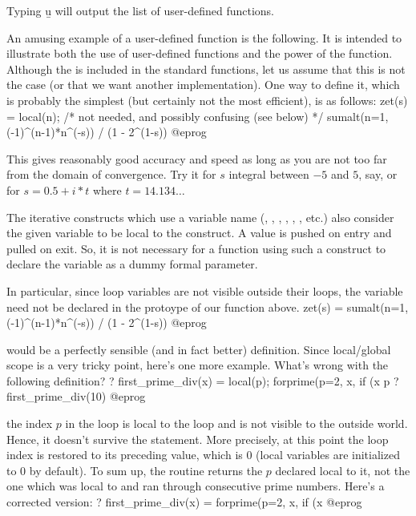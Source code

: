 Typing \b{u} will output the list of user-defined functions.

An amusing example of a user-defined function is the following. It is
intended to illustrate both the use of user-defined functions and the power
of the  function. Although the  is
included in the standard functions, let us assume that this is not the case
(or that we want another implementation). One way to define it, which is
probably the simplest (but certainly not the most efficient), is as
follows:
\bprog
zet(s) =
{
  local(n); /* not needed, and possibly confusing (see below) */
  sumalt(n=1, (-1)^(n-1)*n^(-s)) / (1 - 2^(1-s))
}
@eprog

\noindent This gives reasonably good accuracy and speed as long as you are
not too far from the domain of convergence. Try it for $s$ integral between
$-5$ and $5$, say, or for $s=0.5+i*t$ where $t=14.134\dots$

The iterative constructs which use a variable name (,
, , , , ,
etc.) also consider the given variable to be local to the construct. A value
is pushed on entry and pulled on exit. So, it is not necessary for a function
using such a construct to declare the variable as a dummy formal parameter.

In particular, since loop variables are not visible outside their loops,
the variable  need not be declared in the protoype of our 
function above.
\bprog
zet(s) = sumalt(n=1, (-1)^(n-1)*n^(-s)) / (1 - 2^(1-s))
@eprog

\noindent would be a perfectly sensible (and in fact better) definition.
Since local/global scope is a very tricky point, here's one more example.
What's wrong with the following definition?
\bprog
? first_prime_div(x) = 
{
  local(p);
  forprime(p=2, x, if (x%
  p
}
? first_prime_div(10)
@eprog

 the index $p$ in the  loop is local to
the loop and is not visible to the outside world. Hence, it doesn't survive
the  statement. More precisely, at this point the loop index is
restored to its preceding value, which is 0 (local variables are
initialized to 0 by default). To sum up, the routine returns the $p$
declared local to it, not the one which was local to  and ran
through consecutive prime numbers. Here's a corrected version:
\bprog
? first_prime_div(x) = forprime(p=2, x, if (x%
@eprog

